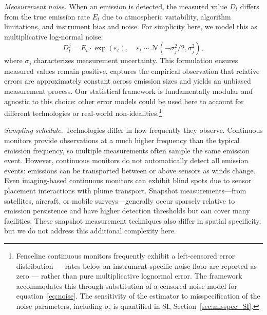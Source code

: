 \documentclass[unnumsec,webpdf,modern,mediumone]{oup-authoring-template}
\newcommand{\new}[1]{{\color{blue}#1}}
\begin{document}
\textit{Measurement noise.} When an emission is detected, the measured value $D_t$ differs from the true emission rate $E_t$ due to atmospheric variability, algorithm limitations, and instrument bias and noise. For simplicity here, we model this as multiplicative log-normal noise:
\begin{equation}
    D^j_t = E_t \cdot \exp(\varepsilon_t), \quad \varepsilon_t \sim \mathcal{N}(-\sigma_j^2/2, \sigma_j^2),
    \label{eq:noise}
\end{equation}
where $\sigma_j$ characterizes measurement uncertainty. This formulation ensures measured values remain positive, captures the empirical observation that relative errors are approximately constant across emission sizes and yields an unbiased measurement process. Our statistical framework is fundamentally modular  and agnostic to this choice: other error models could be used here to account for different technologies or real-world non-idealities.\new{\footnote{Fenceline continuous monitors frequently exhibit a left-censored error distribution — rates below an instrument-specific noise floor are reported as zero — rather than pure multiplicative lognormal error. The framework accommodates this through substitution of a censored noise model for equation~\eqref{eq:noise}. The sensitivity of the estimator to misspecification of the noise parameters, including $\sigma$, is quantified in SI, Section~\ref{sec:misspec_SI}.}} %

\textit{Sampling schedule.} Technologies differ in how frequently they observe. Continuous monitors provide observations at a much higher frequency than the typical emission frequency, so multiple measurements often sample the same emission event. However, continuous monitors do not automatically detect all emission events: emissions can be transported between or above sensors as winds change. Even imaging-based continuous monitors can exhibit blind spots due to sensor placement interactions with plume transport. Snapshot measurements---from satellites, aircraft, or mobile surveys---generally occur sparsely relative to emission persistence and have higher detection thresholds but can cover many facilities. These snapshot measurement techniques also differ in spatial specificity, but we do not address this additional complexity here.
\end{document}
